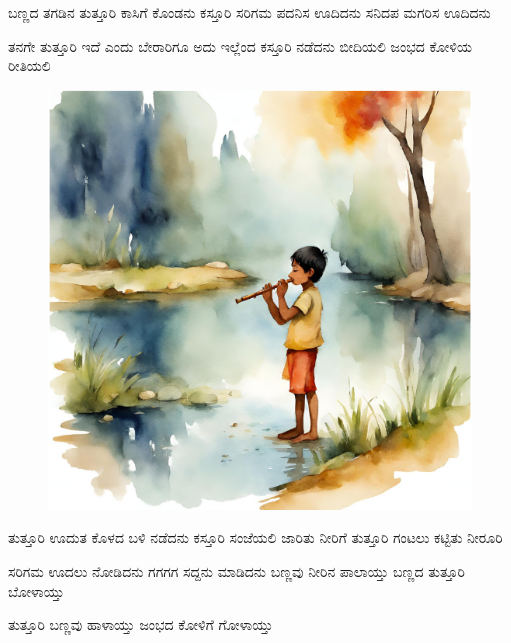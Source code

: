 \documentclass{article}
\begin{document}
\begin{poem}
  \begin{stanza}
    ಬಣ್ಣದ ತಗಡಿನ ತುತ್ತೂರಿ \verseline
    ಕಾಸಿಗೆ ಕೊಂಡನು ಕಸ್ತೂರಿ \verseline
    ಸರಿಗಮ ಪದನಿಸ ಊದಿದನು \verseline
    ಸನಿದಪ ಮಗರಿಸ ಊದಿದನು
  \end{stanza}
  \begin{stanza}
    ತನಗೇ ತುತ್ತೂರಿ ಇದೆ ಎಂದು \verseline
    ಬೇರಾರಿಗೂ ಅದು ಇಲ್ಲೆಂದ \verseline
    ಕಸ್ತೂರಿ ನಡೆದನು ಬೀದಿಯಲಿ \verseline
    ಜಂಭದ ಕೋಳಿಯ ರೀತಿಯಲಿ
  \end{stanza}
  \begin{figure}[h!]
    \centering
    \includegraphics[scale=0.3]{tuttoori.png}
  \end{figure}
  \begin{stanza}
    ತುತ್ತೂರಿ ಊದುತ ಕೊಳದ ಬಳಿ \verseline
    ನಡೆದನು ಕಸ್ತೂರಿ ಸಂಜೆಯಲಿ \verseline
    ಜಾರಿತು ನೀರಿಗೆ ತುತ್ತೂರಿ \verseline
    ಗಂಟಲು ಕಟ್ಟಿತು ನೀರೂರಿ
  \end{stanza}
  \begin{stanza}
    ಸರಿಗಮ ಊದಲು ನೋಡಿದನು \verseline
    ಗಗಗಗ ಸದ್ದನು ಮಾಡಿದನು \verseline
    ಬಣ್ಣವು ನೀರಿನ ಪಾಲಾಯ್ತು \verseline
    ಬಣ್ಣದ ತುತ್ತೂರಿ ಬೋಳಾಯ್ತು
  \end{stanza}
  \begin{stanza}
    ತುತ್ತೂರಿ ಬಣ್ಣವು ಹಾಳಾಯ್ತು \verseline
    ಜಂಭದ ಕೋಳಿಗೆ ಗೋಳಾಯ್ತು
  \end{stanza}
\end{poem}
\end{document}
